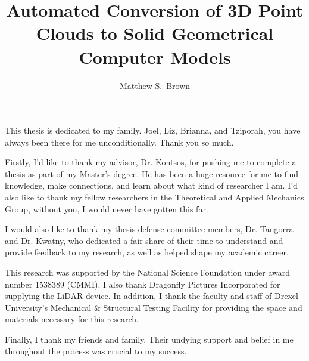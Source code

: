 \documentclass[12pt]{drexelthesis}
\title{Automated Conversion of 3D Point Clouds to Solid Geometrical Computer Models}
\author{Matthew S.~Brown}
\begin{document}
\maketitle
\begin{preliminary}

\newpage

\setcounter{page}{2}

\date{} %

\begin{dedication}
This thesis is dedicated to my family. Joel, Liz, Brianna, and Tziporah, you have always been there for me unconditionally. Thank you so much.

\end{dedication}

\begin{acknowledgements}
	Firstly, I'd like to thank my advisor, Dr. Kontsos, for pushing me to complete a thesis as part of my Master's degree. He has been a huge resource for me to find knowledge, make connections, and learn about what kind of researcher I am. I'd also like to thank my fellow researchers in the Theoretical and Applied Mechanics Group, without you, I would never have gotten this far.

	I would also like to thank my thesis defense committee members, Dr. Tangorra and Dr. Kwatny, who dedicated a fair share of their time to understand and provide feedback to my research, as well as helped shape my academic career.

	This research was supported by the National Science Foundation under award number 1538389 (CMMI). I also thank Dragonfly Pictures Incorporated for supplying the LiDAR device. In addition, I thank the faculty and staff of Drexel University’s Mechanical \& Structural Testing Facility for providing the space and materials necessary for this research.

	Finally, I thank my friends and family. Their undying support and belief in me throughout the process was crucial to my success.

\end{acknowledgements}



\end{preliminary}
\end{document}
